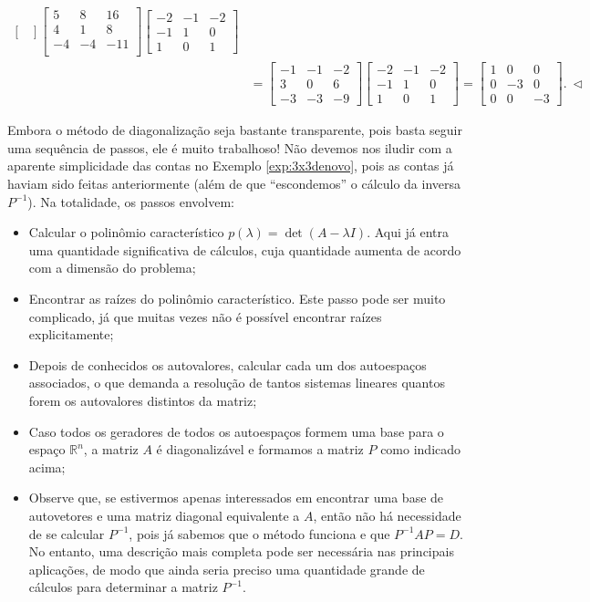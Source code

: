 \documentclass[../livro.tex]{subfiles}  %
\begin{document}
\begin{example}
\begin{align*}
\begin{bmatrix}
	\end{bmatrix}
	\begin{bmatrix}
	5 & 8 & 16 \\ 4 & 1 & 8 \\ -4 & -4 & -11 \\
	\end{bmatrix}
	\begin{bmatrix}
	-2&-1&-2 \\ -1&1&0 \\ 1&0&1
	\end{bmatrix} \\
	& =
	\begin{bmatrix}
	-1&-1&-2 \\ 3&0&6 \\ -3&-3&-9
	\end{bmatrix}
	\begin{bmatrix}
	-2&-1&-2 \\ -1&1&0 \\ 1&0&1
	\end{bmatrix} =
	\begin{bmatrix}
	1&0&0 \\ 0&-3&0 \\ 0&0&-3
	\end{bmatrix}. \ \lhd
          \end{align*}
\end{example}

Embora o método de diagonalização seja bastante transparente, pois basta seguir uma sequência de passos, ele é muito trabalhoso! Não devemos nos iludir com a aparente simplicidade das contas no Exemplo \ref{exp:3x3denovo}, pois as contas já haviam sido feitas anteriormente (além de que ``escondemos'' o cálculo da inversa $P^{-1}$). Na totalidade, os passos envolvem:
\begin{itemize}
\item Calcular o polinômio característico $p(\lambda) = \det (A - \lambda I)$. Aqui já entra uma quantidade significativa de cálculos, cuja quantidade aumenta de acordo com a dimensão do problema;
\item Encontrar as raízes do polinômio característico. Este passo pode ser muito complicado, já que muitas vezes não é possível encontrar raízes explicitamente;
\item Depois de conhecidos os autovalores, calcular cada um dos autoespaços associados, o que demanda a resolução de tantos sistemas lineares quantos forem os autovalores distintos da matriz;
\item Caso todos os geradores de todos os autoespaços formem uma base para o espaço $\mathbb{R}^n$, a matriz $A$ é diagonalizável e formamos a matriz $P$ como indicado acima;
\item Observe que, se estivermos apenas interessados em encontrar uma base de autovetores e uma matriz diagonal equivalente a $A$, então não há necessidade de se calcular $P^{-1}$, pois já sabemos que o método funciona e que $P^{-1} AP = D$. No entanto, uma descrição mais completa pode ser necessária nas principais aplicações, de modo que ainda seria preciso uma quantidade grande de cálculos para determinar a matriz $P^{-1}$.
\end{itemize}
\end{document}
